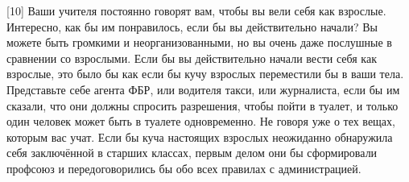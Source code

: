 \documentclass[ebook,12pt,oneside,openany]{memoir}
\begin{document}
[10] Ваши учителя постоянно говорят вам, чтобы вы вели себя как
взрослые. Интересно, как бы им понравилось, если бы вы действительно
начали? Вы можете быть громкими и неорганизованными, но вы очень даже
послушные в сравнении со взрослыми. Если бы вы действительно начали
вести себя как взрослые, это было бы как если бы кучу взрослых
переместили бы в ваши тела. Представьте себе агента ФБР, или водителя
такси, или журналиста, если бы им сказали, что они должны спросить
разрешения, чтобы пойти в туалет, и только один человек может быть в
туалете одновременно. Не говоря уже о тех вещах, которым вас учат.
Если бы куча настоящих взрослых неожиданно обнаружила себя заключённой
в старших классах, первым делом они бы сформировали профсоюз и
передоговорились бы обо всех правилах с администрацией.
\end{document}
